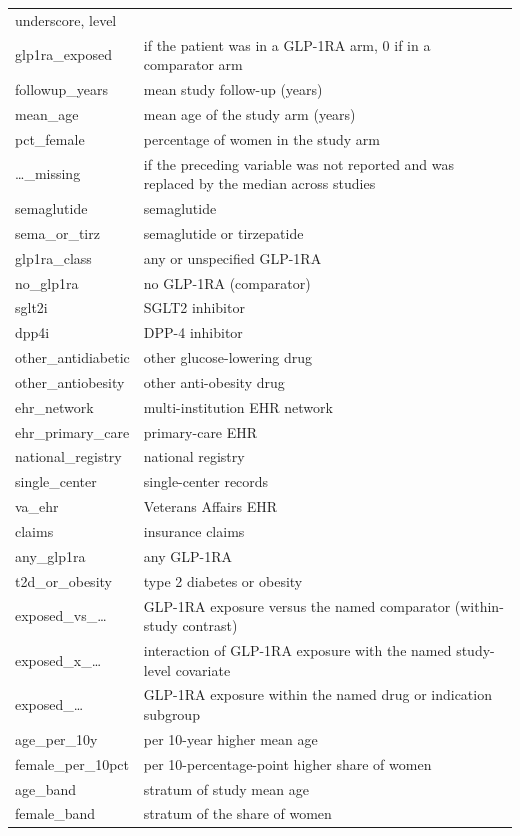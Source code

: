 \documentclass[journal]{IEEEtran}
\begin{document}
{\begin{longtable}[]{@{}
  >{\raggedright\arraybackslash}p{}
  >{\raggedright\arraybackslash}p{}@{}}
underscore, level \\
glp1ra\_exposed & 1 if the patient was in a GLP-1RA arm, 0 if in a
comparator arm \\
followup\_years & mean study follow-up (years) \\
mean\_age & mean age of the study arm (years) \\
pct\_female & percentage of women in the study arm \\
\ldots\_missing & 1 if the preceding variable was not reported and was
replaced by the median across studies \\
semaglutide & semaglutide \\
sema\_or\_tirz & semaglutide or tirzepatide \\
glp1ra\_class & any or unspecified GLP-1RA \\
no\_glp1ra & no GLP-1RA (comparator) \\
sglt2i & SGLT2 inhibitor \\
dpp4i & DPP-4 inhibitor \\
other\_antidiabetic & other glucose-lowering drug \\
other\_antiobesity & other anti-obesity drug \\
ehr\_network & multi-institution EHR network \\
ehr\_primary\_care & primary-care EHR \\
national\_registry & national registry \\
single\_center & single-center records \\
va\_ehr & Veterans Affairs EHR \\
claims & insurance claims \\
any\_glp1ra & any GLP-1RA \\
t2d\_or\_obesity & type 2 diabetes or obesity \\
exposed\_vs\_\ldots{} & GLP-1RA exposure versus the named comparator
(within-study contrast) \\
exposed\_x\_\ldots{} & interaction of GLP-1RA exposure with the named
study-level covariate \\
exposed\_\ldots{} & GLP-1RA exposure within the named drug or indication
subgroup \\
age\_per\_10y & per 10-year higher mean age \\
female\_per\_10pct & per 10-percentage-point higher share of women \\
age\_band & stratum of study mean age \\
female\_band & stratum of the share of women \\

\end{longtable}}
\end{document}
